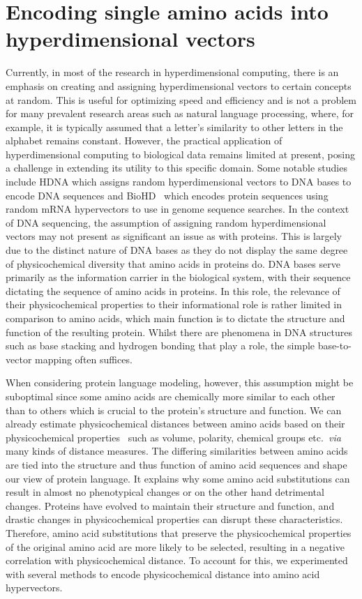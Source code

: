 \section{Encoding single amino acids into hyperdimensional vectors}
Currently, in most of the research in hyperdimensional computing, there is an emphasis on creating and assigning hyperdimensional vectors to certain concepts at random. This is useful for optimizing speed and efficiency and is not a problem for many prevalent research areas such as natural language processing, where, for example, it is typically assumed that a letter's similarity to other letters in the alphabet remains constant. However, the practical application of hyperdimensional computing to biological data remains limited at present, posing a challenge in extending its utility to this specific domain. Some notable studies include HDNA which assigns random hyperdimensional vectors to DNA bases to encode DNA sequences and BioHD~\cite{biohd} which encodes protein sequences using random mRNA hypervectors to use in genome sequence searches. In the context of DNA sequencing, the assumption of assigning random hyperdimensional vectors may not present as significant an issue as with proteins. This is largely due to the distinct nature of DNA bases as they do not display the same degree of physicochemical diversity that amino acids in proteins do. DNA bases serve primarily as the information carrier in the biological system, with their sequence dictating the sequence of amino acids in proteins. In this role, the relevance of their physicochemical properties to their informational role is rather limited in comparison to amino acids, which main function is to dictate the structure and function of the resulting protein. Whilst there are phenomena in DNA structures such as base stacking and hydrogen bonding that play a role, the simple base-to-vector mapping often suffices.

When considering protein language modeling, however, this assumption might be suboptimal since some amino acids are chemically more similar to each other than to others which is crucial to the protein's structure and function. We can already estimate physicochemical distances between amino acids based on their physicochemical properties~\cite{physicochem} such as volume, polarity, chemical groups etc.\ \textit{via} many kinds of distance measures. The differing similarities between amino acids are tied into the structure and thus function of amino acid sequences and shape our view of protein language. It explains why some amino acid substitutions can result in almost no phenotypical changes or on the other hand detrimental changes. Proteins have evolved to maintain their structure and function, and drastic changes in physicochemical properties can disrupt these characteristics. Therefore, amino acid substitutions that preserve the physicochemical properties of the original amino acid are more likely to be selected, resulting in a negative correlation with physicochemical distance. To account for this, we experimented with several methods to encode physicochemical distance into amino acid hypervectors.

